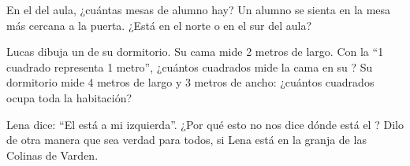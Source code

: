 \begin{exercise}[$\star\star$]\label{exo:g2:drawing-to-map:9}
En el  del aula, ¿cuántas mesas de alumno hay? Un alumno se sienta en
la mesa más cercana a la puerta. ¿Está en el norte o en el sur del aula?
\end{exercise}

\begin{exercise}[$\star\star$]\label{exo:g2:drawing-to-map:10}
Lucas dibuja un  de su dormitorio. Su cama mide 2 metros de largo. Con
la  ``1 cuadrado representa 1 metro'', ¿cuántos cuadrados mide la cama
en su ? Su dormitorio mide 4 metros de largo y 3 metros de ancho:
¿cuántos cuadrados ocupa toda la habitación?
\end{exercise}

\begin{exercise}[$\star\star$]\label{exo:g2:drawing-to-map:11}
Lena dice: ``El  está a mi izquierda''. ¿Por qué esto no nos dice dónde
está el ? Dilo de otra manera que sea verdad para todos, si Lena está en
la granja de las Colinas de Varden.
\end{exercise}
